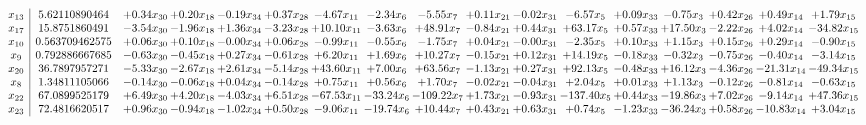 \documentclass[9pt]{article}
\begin{document}
 \[\begin{array}{c| c c@{\hskip 2pt} c@{\hskip 2pt} c@{\hskip 2pt} c@{\hskip 2pt} c@{\hskip 2pt} c@{\hskip 2pt} c@{\hskip 2pt} c@{\hskip 2pt} c@{\hskip 2pt} c@{\hskip 2pt} c@{\hskip 2pt} c@{\hskip 2pt} c@{\hskip 2pt} c@{\hskip 2pt} c@{\hskip 2pt} }
 x_{13}   &  5.62110890464 & +  0.34 x_{30} & +  0.20 x_{18} & -0.19 x_{34} & +  0.37 x_{28} & -4.67 x_{11} & -2.34 x_{6} & -5.55 x_{7} & +  0.11 x_{21} & -0.02 x_{31} & -6.57 x_{5} & +  0.09 x_{33} & -0.75 x_{3} & +  0.42 x_{26} & +  0.49 x_{14} & +  1.79 x_{15}\\
 x_{17}   &  15.8751860491 & -3.54 x_{30} & -1.96 x_{18} & +  1.36 x_{34} & -3.23 x_{28} & + 10.10 x_{11} & -3.63 x_{6} & + 48.91 x_{7} & -0.84 x_{21} & +  0.44 x_{31} & + 63.17 x_{5} & +  0.57 x_{33} & + 17.50 x_{3} & -2.22 x_{26} & +  4.02 x_{14} & -34.82 x_{15}\\
 x_{10}   &  0.563709462575 & +  0.06 x_{30} & +  0.10 x_{18} & -0.00 x_{34} & +  0.06 x_{28} & -0.99 x_{11} & -0.55 x_{6} & -1.75 x_{7} & +  0.04 x_{21} & -0.00 x_{31} & -2.35 x_{5} & +  0.10 x_{33} & +  1.15 x_{3} & +  0.15 x_{26} & +  0.29 x_{14} & -0.90 x_{15}\\
 x_{9}   &  0.792886667685 & -0.63 x_{30} & -0.45 x_{18} & +  0.27 x_{34} & -0.61 x_{28} & +  6.20 x_{11} & +  1.69 x_{6} & + 10.27 x_{7} & -0.15 x_{21} & +  0.12 x_{31} & + 14.19 x_{5} & -0.18 x_{33} & -0.32 x_{3} & -0.75 x_{26} & -0.40 x_{14} & -3.14 x_{15}\\
 x_{20}   &  36.7897957271 & -5.33 x_{30} & -2.67 x_{18} & +  2.61 x_{34} & -5.14 x_{28} & + 43.60 x_{11} & +  7.00 x_{6} & + 63.56 x_{7} & -1.13 x_{21} & +  0.27 x_{31} & + 92.13 x_{5} & -0.48 x_{33} & + 16.12 x_{3} & -4.36 x_{26} & -21.31 x_{14} & -49.34 x_{15}\\
 x_{8}   &  1.34811105066 & -0.14 x_{30} & -0.06 x_{18} & +  0.04 x_{34} & -0.14 x_{28} & +  0.75 x_{11} & +  0.56 x_{6} & +  1.70 x_{7} & -0.02 x_{21} & -0.04 x_{31} & +  2.04 x_{5} & +  0.01 x_{33} & +  1.13 x_{3} & -0.12 x_{26} & -0.81 x_{14} & -0.63 x_{15}\\
 x_{22}   &  67.0899525179 & +  6.49 x_{30} & +  4.20 x_{18} & -4.03 x_{34} & +  6.51 x_{28} & -67.53 x_{11} & -33.24 x_{6} & -109.22 x_{7} & +  1.73 x_{21} & -0.93 x_{31} & -137.40 x_{5} & +  0.44 x_{33} & -19.86 x_{3} & +  7.02 x_{26} & -9.14 x_{14} & + 47.36 x_{15}\\
 x_{23}   &  72.4816620517 & +  0.96 x_{30} & -0.94 x_{18} & -1.02 x_{34} & +  0.50 x_{28} & -9.06 x_{11} & -19.74 x_{6} & + 10.44 x_{7} & +  0.43 x_{21} & +  0.63 x_{31} & +  0.74 x_{5} & -1.23 x_{33} & -36.24 x_{3} & +  0.58 x_{26} & -10.83 x_{14} & +  3.04 x_{15}\\

\end{array}\]
\end{document}
